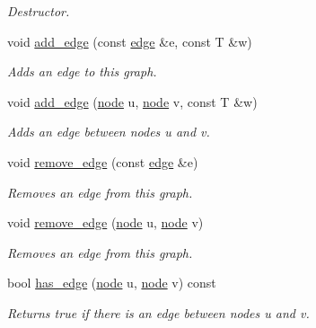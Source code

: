 \begin{DoxyCompactItemize}
\begin{DoxyCompactList}\small\item\em Destructor. \end{DoxyCompactList}\item 
void \hyperlink{classlgraph_1_1utils_1_1wdgraph_a28926dd95b2d19ee32adf5d5434af89b}{add\+\_\+edge} (const \hyperlink{namespacelgraph_1_1utils_a6510284ce1b1ae5dc97ce5d2de426e10}{edge} \&e, const T \&w)
\begin{DoxyCompactList}\small\item\em Adds an edge to this graph. \end{DoxyCompactList}\item 
void \hyperlink{classlgraph_1_1utils_1_1wdgraph_a5c96c31a8b5d70829bf023382d7c1997}{add\+\_\+edge} (\hyperlink{namespacelgraph_1_1utils_a7bd66ede3805ef121bc2835bd48de0cf}{node} u, \hyperlink{namespacelgraph_1_1utils_a7bd66ede3805ef121bc2835bd48de0cf}{node} v, const T \&w)
\begin{DoxyCompactList}\small\item\em Adds an edge between nodes {\itshape u} and {\itshape v}. \end{DoxyCompactList}\item 
void \hyperlink{classlgraph_1_1utils_1_1wdgraph_a651404f9702d4fa43baa2cb6df0d4912}{remove\+\_\+edge} (const \hyperlink{namespacelgraph_1_1utils_a6510284ce1b1ae5dc97ce5d2de426e10}{edge} \&e)
\begin{DoxyCompactList}\small\item\em Removes an edge from this graph. \end{DoxyCompactList}\item 
void \hyperlink{classlgraph_1_1utils_1_1wdgraph_a6b2ec7e7c66f0ae5aa8ebe5d0555c3a7}{remove\+\_\+edge} (\hyperlink{namespacelgraph_1_1utils_a7bd66ede3805ef121bc2835bd48de0cf}{node} u, \hyperlink{namespacelgraph_1_1utils_a7bd66ede3805ef121bc2835bd48de0cf}{node} v)
\begin{DoxyCompactList}\small\item\em Removes an edge from this graph. \end{DoxyCompactList}\item 
bool \hyperlink{classlgraph_1_1utils_1_1wdgraph_ac74f172c5a6bdbf56ac5a4013fae880a}{has\+\_\+edge} (\hyperlink{namespacelgraph_1_1utils_a7bd66ede3805ef121bc2835bd48de0cf}{node} u, \hyperlink{namespacelgraph_1_1utils_a7bd66ede3805ef121bc2835bd48de0cf}{node} v) const 
\begin{DoxyCompactList}\small\item\em Returns true if there is an edge between nodes {\itshape u} and {\itshape v}. \end{DoxyCompactList}\item 

\end{DoxyCompactItemize}
